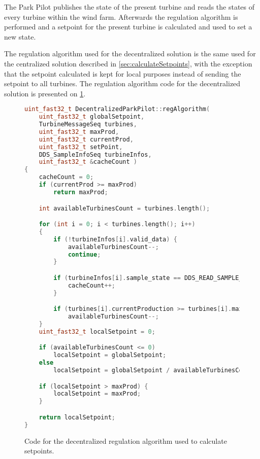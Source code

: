 The Park Pilot publishes the state of the present turbine and reads the states of every turbine within the wind farm. Afterwards the regulation algorithm is performed and a setpoint for the present turbine is calculated and used to set a new state.

The regulation algorithm used for the decentralized solution is the same used for the centralized solution described in \cref{sec:calculateSetpoints}, with the exception that the setpoint calculated is kept for local purposes instead of sending the setpoint to all turbines. The regulation algorithm code for the decentralized solution is presented on \cref{fig:decenRegAlgCode}.

\begin{figure}[!h]
	\centering
	\begin{lstlisting}[language=C++,tabsize=2,basicstyle=\small]
uint_fast32_t DecentralizedParkPilot::regAlgorithm(
	uint_fast32_t globalSetpoint,
	TurbineMessageSeq turbines,
	uint_fast32_t maxProd,
	uint_fast32_t currentProd,
	uint_fast32_t setPoint,
	DDS_SampleInfoSeq turbineInfos,
	uint_fast32_t &cacheCount )
{
	cacheCount = 0;
	if (currentProd >= maxProd)
		return maxProd;

	int availableTurbinesCount = turbines.length();

	for (int i = 0; i < turbines.length(); i++)
	{
		if (!turbineInfos[i].valid_data) {
			availableTurbinesCount--;
			continue;
		}

		if (turbineInfos[i].sample_state == DDS_READ_SAMPLE_STATE) {
			cacheCount++;
		}

		if (turbines[i].currentProduction >= turbines[i].maxProduction)
			availableTurbinesCount--;
	}
	uint_fast32_t localSetpoint = 0;

	if (availableTurbinesCount <= 0)
		localSetpoint = globalSetpoint;
	else
		localSetpoint = globalSetpoint / availableTurbinesCount;

	if (localSetpoint > maxProd) {
		localSetpoint = maxProd;
	}

	return localSetpoint;
}
	\end{lstlisting}
	\caption[The regulation algorithm of the decentralized solution]{
		\label{fig:decenRegAlgCode} 
		\footnotesize{%
			Code for the decentralized regulation algorithm used to calculate setpoints.
		}
	}
\end{figure}


